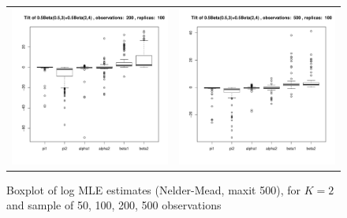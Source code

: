 \begin{figure}[h]
\begin{tabular}{cc}
\includegraphics[width=\textwidth/2]{../img/p05_a05_b3_p05_a2_b4/tilted/K2/bxplots/n200_R100.pdf}
&
\includegraphics[width=\textwidth/2]{../img/p05_a05_b3_p05_a2_b4/tilted/K2/bxplots/n500_R100.pdf}\\
\end{tabular}
\caption{Boxplot of log MLE estimates (Nelder-Mead, maxit 500), for $K=2$ and sample of 50, 100, 200, 500 observations}
\label{fig:TBD2}
\end{figure}


